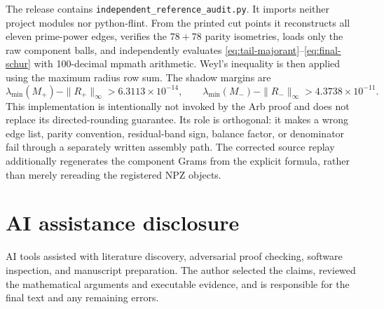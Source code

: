 \documentclass[10pt]{article}
\begin{document}
The release contains \nolinkurl{independent_reference_audit.py}.  It imports
neither project modules nor python-flint.  From the printed cut points it
reconstructs all eleven prime-power edges, verifies the $78+78$ parity
isometries, loads only the raw component balls, and independently evaluates
\eqref{eq:tail-majorant}--\eqref{eq:final-schur} with 100-decimal mpmath
arithmetic.  Weyl's inequality is then applied using the maximum radius row
sum.  The shadow margins are
\[
 \lambda_{\min}(M_+)-\|R_+\|_\infty
 >6.3113\times10^{-14},\qquad
 \lambda_{\min}(M_-)-\|R_-\|_\infty
 >4.3738\times10^{-11}.
\]
This implementation is intentionally not invoked by the Arb proof and does
not replace its directed-rounding guarantee.  Its role is orthogonal: it makes
a wrong edge list, parity convention, residual-band sign, balance factor, or
denominator fail through a separately written assembly path.  The corrected
source replay additionally regenerates the component Grams from the explicit
formula, rather than merely rereading the registered NPZ objects.

\section*{AI assistance disclosure}
AI tools assisted with literature discovery, adversarial proof checking,
software inspection, and manuscript preparation.  The author selected the
claims, reviewed the mathematical arguments and executable evidence, and is
responsible for the final text and any remaining errors.
\end{document}
